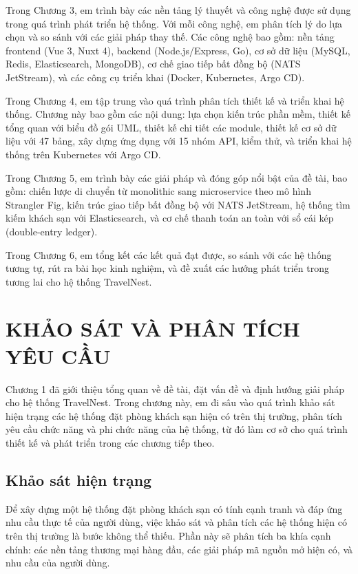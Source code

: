 \documentclass[13pt,a4paper,twoside]{report}
\begin{document}
Trong Chương 3, em trình bày các nền tảng lý thuyết và công nghệ được sử dụng trong quá trình phát triển hệ thống. Với mỗi công nghệ, em phân tích lý do lựa chọn và so sánh với các giải pháp thay thế. Các công nghệ bao gồm: nền tảng frontend (Vue 3, Nuxt 4), backend (Node.js/Express, Go), cơ sở dữ liệu (MySQL, Redis, Elasticsearch, MongoDB), cơ chế giao tiếp bất đồng bộ (NATS JetStream), và các công cụ triển khai (Docker, Kubernetes, Argo CD).

Trong Chương 4, em tập trung vào quá trình phân tích thiết kế và triển khai hệ thống. Chương này bao gồm các nội dung: lựa chọn kiến trúc phần mềm, thiết kế tổng quan với biểu đồ gói UML, thiết kế chi tiết các module, thiết kế cơ sở dữ liệu với 47 bảng, xây dựng ứng dụng với 15 nhóm API, kiểm thử, và triển khai hệ thống trên Kubernetes với Argo CD.

Trong Chương 5, em trình bày các giải pháp và đóng góp nổi bật của đề tài, bao gồm: chiến lược di chuyển từ monolithic sang microservice theo mô hình Strangler Fig, kiến trúc giao tiếp bất đồng bộ với NATS JetStream, hệ thống tìm kiếm khách sạn với Elasticsearch, và cơ chế thanh toán an toàn với sổ cái kép (double-entry ledger).

Trong Chương 6, em tổng kết các kết quả đạt được, so sánh với các hệ thống tương tự, rút ra bài học kinh nghiệm, và đề xuất các hướng phát triển trong tương lai cho hệ thống TravelNest.

\chapter{KHẢO SÁT VÀ PHÂN TÍCH YÊU CẦU}

Chương 1 đã giới thiệu tổng quan về đề tài, đặt vấn đề và định hướng giải pháp cho hệ thống TravelNest. Trong chương này, em đi sâu vào quá trình khảo sát hiện trạng các hệ thống đặt phòng khách sạn hiện có trên thị trường, phân tích yêu cầu chức năng và phi chức năng của hệ thống, từ đó làm cơ sở cho quá trình thiết kế và phát triển trong các chương tiếp theo.

\section{Khảo sát hiện trạng}

Để xây dựng một hệ thống đặt phòng khách sạn có tính cạnh tranh và đáp ứng nhu cầu thực tế của người dùng, việc khảo sát và phân tích các hệ thống hiện có trên thị trường là bước không thể thiếu. Phần này sẽ phân tích ba khía cạnh chính: các nền tảng thương mại hàng đầu, các giải pháp mã nguồn mở hiện có, và nhu cầu của người dùng.
\end{document}
